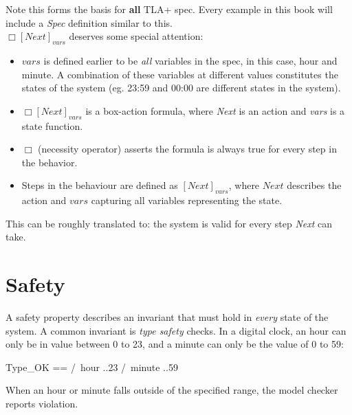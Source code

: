 Note this forms the basis for \textbf{all} TLA+ spec. Every example in this book
will include a \textit{Spec} definition similar to this.\\

$\Box[Next]_{vars}$ deserves some special attention:
\begin{itemize}
    \item $vars$ is defined earlier to be \textit{all} variables in the spec, in
    this case, hour and minute. A combination of these variables at different
    values constitutes the states of the system (eg. 23:59 and 00:00 are different states in the system).
    \item $\Box[Next]_{vars}$ is a box-action formula, where \textit{Next} is an
    action and \textit{vars} is a state function.
    \item $\Box$ (necessity operator) asserts the formula is always true for every step in the behavior.
    \item Steps in the behaviour are defined as $[Next]_{vars}$, where $Next$
    describes the action and $vars$ capturing all variables representing the state.
\end{itemize}

This can be roughly translated to: the system is valid for every step
\textit{Next} can take.

\section{Safety}

A safety property describes an invariant that must hold in \textit{every} state
of the system. A common invariant is \textit{type safety} checks. In a digital
clock, an hour can only be in value between 0 to 23, and a minute can only be the value
of 0 to 59:\newline

\begin{tla}
    Type_OK == 
        /\ hour ..23
        /\ minute ..59
\end{tla}
\begin{tlatex}
%
%
%
\end{tlatex}
\newline

When an hour or minute falls outside of the specified range, the model checker 
reports violation.

